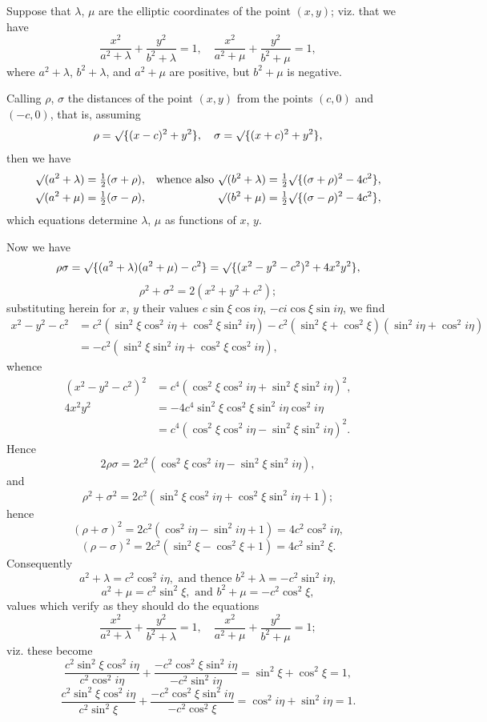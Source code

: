 \documentclass[12pt,a4paper]{article}
\theoremstyle{cayley}
\theoremstyle{definition}
\numberwithin{equation}{section}
\begin{document}
Suppose that $\lambda$, $\mu$ are the elliptic coordinates of the point $(x, y)$; viz. that we have
\[
\frac{x^2}{a^2 + \lambda} + \frac{y^2}{b^2 + \lambda} = 1, \quad \frac{x^2}{a^2 + \mu} + \frac{y^2}{b^2 + \mu} = 1,
\]
where $a^2 + \lambda$, $b^2 + \lambda$, and $a^2 + \mu$ are positive, but $b^2 + \mu$ is negative.

Calling $\rho$, $\sigma$ the distances of the point $(x, y)$ from the points $(c, 0)$ and $(-c, 0)$, that is, assuming
\[
\rho = \surd\{(x - c)^2 + y^2\}, \quad \sigma = \surd\{(x + c)^2 + y^2\},
\]
then we have
\begin{align*}
\surd(a^2 + \lambda) &= \tfrac{1}{2}(\sigma + \rho), & \text{whence also } \surd(b^2 + \lambda) &= \tfrac{1}{2} \surd\{(\sigma + \rho)^2 - 4c^2\}, \\
\surd(a^2 + \mu) &= \tfrac{1}{2}(\sigma - \rho), & \surd(b^2 + \mu) &= \tfrac{1}{2} \surd\{(\sigma - \rho)^2 - 4c^2\},
\end{align*}
which equations determine $\lambda$, $\mu$ as functions of $x$, $y$.

Now we have
\[
\rho\sigma = \surd\{(a^2 + \lambda)(a^2 + \mu) - c^2\} = \surd\{(x^2 - y^2 - c^2)^2 + 4x^2y^2\},
\]
\[
\rho^2 + \sigma^2 = 2(x^2 + y^2 + c^2);
\]
substituting herein for $x$, $y$ their values $c \sin \xi \cos i\eta$, $-ci \cos \xi \sin i\eta$, we find
\begin{align*}
x^2 - y^2 - c^2 &= c^2(\sin^2 \xi \cos^2 i\eta + \cos^2 \xi \sin^2 i\eta) - c^2(\sin^2 \xi + \cos^2 \xi)(\sin^2 i\eta + \cos^2 i\eta) \\
&= -c^2(\sin^2 \xi \sin^2 i\eta + \cos^2 \xi \cos^2 i\eta),
\end{align*}
whence
\begin{align*}
(x^2 - y^2 - c^2)^2 &= c^4(\cos^2 \xi \cos^2 i\eta + \sin^2 \xi \sin^2 i\eta)^2, \\
4x^2y^2 &= -4c^4 \sin^2 \xi \cos^2 \xi \sin^2 i\eta \cos^2 i\eta \\
&= c^4(\cos^2 \xi \cos^2 i\eta - \sin^2 \xi \sin^2 i\eta)^2.
\end{align*}
Hence
\[
2\rho\sigma = 2c^2(\cos^2 \xi \cos^2 i\eta - \sin^2 \xi \sin^2 i\eta),
\]
and
\[
\rho^2 + \sigma^2 = 2c^2(\sin^2 \xi \cos^2 i\eta + \cos^2 \xi \sin^2 i\eta + 1);
\]
hence
\[
(\rho + \sigma)^2 = 2c^2(\cos^2 i\eta - \sin^2 i\eta + 1) = 4c^2 \cos^2 i\eta,
\]
\[
(\rho - \sigma)^2 = 2c^2(\sin^2 \xi - \cos^2 \xi + 1) = 4c^2 \sin^2 \xi.
\]
Consequently
\[
a^2 + \lambda = c^2 \cos^2 i\eta, \text{ and thence } b^2 + \lambda = -c^2 \sin^2 i\eta,
\]
\[
a^2 + \mu = c^2 \sin^2 \xi, \text{ and } b^2 + \mu = -c^2 \cos^2 \xi,
\]
values which verify as they should do the equations
\[
\frac{x^2}{a^2 + \lambda} + \frac{y^2}{b^2 + \lambda} = 1, \quad \frac{x^2}{a^2 + \mu} + \frac{y^2}{b^2 + \mu} = 1;
\]
viz. these become
\[
\frac{c^2 \sin^2 \xi \cos^2 i\eta}{c^2 \cos^2 i\eta} + \frac{-c^2 \cos^2 \xi \sin^2 i\eta}{-c^2 \sin^2 i\eta} = \sin^2 \xi + \cos^2 \xi = 1,
\]
\[
\frac{c^2 \sin^2 \xi \cos^2 i\eta}{c^2 \sin^2 \xi} + \frac{-c^2 \cos^2 \xi \sin^2 i\eta}{-c^2 \cos^2 \xi} = \cos^2 i\eta + \sin^2 i\eta = 1.
\]
\end{document}
